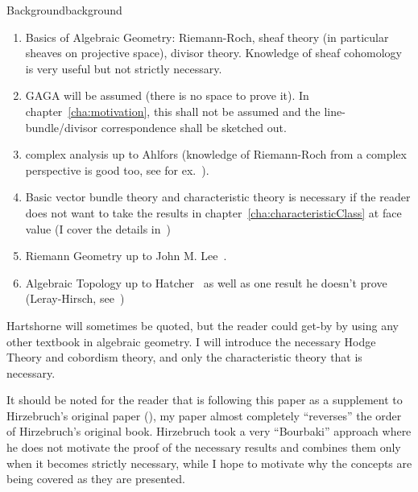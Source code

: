 \documentclass{ut-thesis}
\begin{document}
\begin{titledBox}{Background}{background}
  \begin{enumerate}
  \item Basics of Algebraic Geometry: Riemann-Roch, sheaf theory (in particular sheaves on projective space),
    divisor theory. Knowledge of sheaf cohomology is very useful but not strictly necessary.
  \item GAGA will be assumed (there is no space to prove it). In chapter~\ref{cha:motivation}, this shall not
    be assumed and the line-bundle/divisor correspondence shall be sketched out.
  \item complex analysis up to Ahlfors (knowledge of Riemann-Roch from a complex perspective is good too,
    see for ex.~\cite{a.griffithsIntroductionAlgebraicCurves}).
  \item Basic vector bundle theory and characteristic theory is necessary if the reader does not want to take the results in
    chapter~\ref{cha:characteristicClass} at face value (I cover the details in~\cite{NateKTheory})
  \item Riemann Geometry up to John M. Lee~\cite{leeIntroductionRiemannianManifolds2018}.
  \item Algebraic Topology up to Hatcher~\cite{hatcherAlgebraicTopology} as well as one result he doesn't prove (Leray-Hirsch,
    see~\cite{NateAlgTop})
\end{enumerate}
\end{titledBox}

Hartshorne will sometimes be quoted, but the reader could get-by by using any other textbook in algebraic
geometry. I will introduce the necessary Hodge Theory and cobordism theory, and only the characteristic theory
that is necessary.

It should be noted for the reader that is following this paper as a supplement to Hirzebruch's original paper
(\cite{hirzebruchTopologicalMethodsAlgebraic1995}), my paper almost completely ``reverses'' the order of
Hirzebruch's original book. Hirzebruch took a very ``Bourbaki'' approach where he does not motivate the proof
of the necessary results and combines them only when it becomes strictly necessary, while I hope to motivate
why the concepts are being covered as they are presented.

\end{document}
